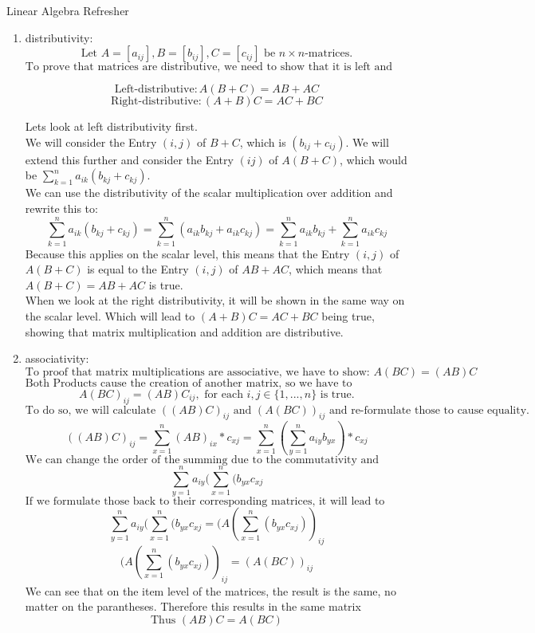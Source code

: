 \documentclass[
	english,
        solution=true
	]{tudaexercise}
\begin{document}
\begin{task}[points=28]{Linear Algebra Refresher}
\begin{subtask}[points=5,title=Matrix Properties]
\begin{solution}
\begin{enumerate}
    \item distributivity:
    \[\text{Let $A=[a_{ij}], B=[b_{ij}], C=[c_{ij}]$ be $n\times n$-matrices.}\]
    \[\text{To prove that matrices are distributive, we need to show that it is left and right distributive:}\]

    \[\text{Left-distributive}: A(B+C)=AB+AC\]
    \[\text{Right-distributive}: (A+B)C=AC+BC\]

   Lets look at left distributivity first.\\
   We will consider the Entry $(i, j)$ of $B+C$, which is $(b_{ij}+c_{ij})$. We will extend this further and consider the Entry $(ij)$ of $A(B+C)$, which would be $\sum^n_{k=1} a_{ik}(b_{kj}+c_{kj})$.\\
   We can use the distributivity of the scalar multiplication over addition and rewrite this to:
   \[\sum^n_{k=1} a_{ik}(b_{kj}+c_{kj})=\sum^n_{k=1}(a_{ik}b_{kj}+a_{ik}c_{kj})=\sum^n_{k=1} a_{ik}b_{kj}+\sum^n_{k=1} a_{ik}c_{kj}\]
   Because this applies on the scalar level, this means that the Entry $(i, j)$ of $A(B+C)$ is equal to the Entry $(i, j)$ of $AB+AC$, which means that $A(B+C)=AB+AC$ is true.\\

   When we look at the right distributivity, it will be shown in the same way on the scalar level. Which will lead to $(A+B)C=AC+BC$ being true, showing that matrix multiplication and addition are distributive.

    \item associativity:
    \[\text{To proof that matrix multiplications are associative, we have to show: } A(BC) = (AB)C\]
    \[\text{Both Products cause the creation of another matrix, so we have to specifically show, that }\]
    \[A(BC)_{ij}=(AB)C_{ij}, \text{ for each } i, j\in\{1, ..., n\} \text{ is true}.\]
    \[\text{To do so, we will calculate $((AB)C)_{ij}$ and $(A(BC))_{ij}$ and re-formulate those to cause equality.}\]
    \[((AB)C)_{ij}=\sum^n_{x=1}(AB)_{ix}*c_{xj}=\sum^n_{x=1}(\sum^n_{y=1}a_{iy}b_{yx})*c_{xj}\]
    \[\text{We can change the order of the summing due to the commutativity and associativity of addition with the scalars.}\]
    \[\sum^n_{y=1}a_{iy}(\sum^n_{x=1}(b_{yx}c_{xj}\]
    \[\text{If we formulate those back to their corresponding matrices, it will lead to following :}\]
    \[\sum^n_{y=1}a_{iy}(\sum^n_{x=1}(b_{yx}c_{xj}=(A(\sum^n_{x=1}(b_{yx}c_{xj}))_{ij}\]
    \[(A(\sum^n_{x=1}(b_{yx}c_{xj}))_{ij}=(A(BC))_{ij}\]
    We can see that on the item level of the matrices, the result is the same, no matter on the parantheses. Therefore this results in the same matrix
    \[\text{Thus $(AB)C=A(BC)$}\]
   

\end{enumerate}
\end{solution}
\end{subtask}
\end{task}
\end{document}
